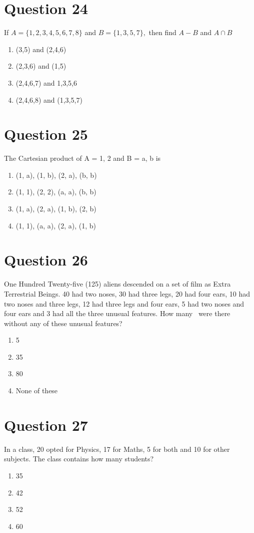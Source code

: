 \documentclass{article}
\begin{document}
\section*{Question 24}
If \(A=\{1,2,3,4,5,6,7,8\}\) and \(B=\{1,3,5,7\},\) then find \(A-B\) and \(A \cap B\)
\begin{enumerate}[label=(\alph*)]
\item (3,5) and (2,4,6)
\item (2,3,6) and (1,5)\newline
\item (2,4,6,7) and {1,3,5,6}
\item (2,4,6,8) and (1,3,5,7)
\end{enumerate}
\newpage
\section*{Question 25}
The Cartesian product of A = {1, 2} and B = {a, b} is\newline
\begin{enumerate}[label=(\alph*)]
\item {(1, a), (1, b), (2, a), (b, b)}
\item {(1, 1), (2, 2), (a, a), (b, b)}
\item {(1, a), (2, a), (1, b), (2, b)}
\item {(1, 1), (a, a), (2, a), (1, b)}
\end{enumerate}
\newpage
\section*{Question 26}
One Hundred Twenty-five (125) aliens descended on a set of film as Extra Terrestrial Beings. 40 had two noses, 30 had three legs, 20 had four ears, 10 had two noses and three legs, 12 had three legs and four ears, 5 had two noses and four ears and 3 had all the three unusual features. How many  were there without any of these unusual features?\newline
\begin{enumerate}[label=(\alph*)]
\item 5
\item 35
\item 80
\item None of these
\end{enumerate}
\newpage
\section*{Question 27}
In a class, 20 opted for Physics, 17 for Maths, 5 for both and 10 for other subjects. The class contains how many students?\newline
\begin{enumerate}[label=(\alph*)]
\item 35
\item 42
\item 52
\item 60
\end{enumerate}
\newpage
\end{document}
